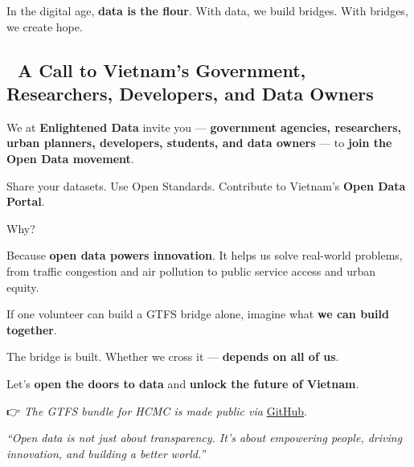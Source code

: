 \documentclass[
]{article}
\begin{document}
In the digital age, \textbf{data is the flour}. With data, we build
bridges. With bridges, we create hope.

\hypertarget{a-call-to-vietnams-government-researchers-developers-and-data-owners}{%
\subsection{🌟 A Call to Vietnam's Government, Researchers, Developers,
and Data
Owners}\label{a-call-to-vietnams-government-researchers-developers-and-data-owners}}

We at \textbf{Enlightened Data} invite you --- \textbf{government
agencies, researchers, urban planners, developers, students, and data
owners} --- to \textbf{join the Open Data movement}.

Share your datasets. Use Open Standards. Contribute to Vietnam's
\textbf{Open Data Portal}.

Why?

Because \textbf{open data powers innovation}. It helps us solve
real-world problems, from traffic congestion and air pollution to public
service access and urban equity.

If one volunteer can build a GTFS bridge alone, imagine what \textbf{we
can build together}.

The bridge is built. Whether we cross it --- \textbf{depends on all of
us}.

Let's \textbf{open the doors to data} and \textbf{unlock the future of
Vietnam}.

👉 \emph{The GTFS bundle for HCMC is made public via}
\href{https://github.com/EnlightenedData/EDprofile/tree/master/data}{GitHub}.

\emph{``Open data is not just about transparency. It's about empowering
people, driving innovation, and building a better world.''}
\end{document}
